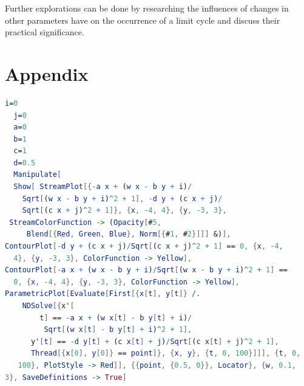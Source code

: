 \documentclass[12pt]{article}
\begin{document}
Further explorations can be done by researching the influences of changes in other parameters have on the occurrence of a limit cycle and discuss their practical significance. 

\section{ Appendix}

\begin{lstlisting}[language=Mathematica, caption=Wilson-Cowan Simulation-Mathematica]
  i=0
  j=0
  a=0
  b=1
  c=1
  d=0.5
  Manipulate[
  Show[ StreamPlot[{-a x + (w x - b y + i)/
    Sqrt[(w x - b y + i)^2 + 1], -d y + (c x + j)/
    Sqrt[(c x + j)^2 + 1]}, {x, -4, 4}, {y, -3, 3}, 
 StreamColorFunction -> (Opacity[#5, 
     Blend[{Red, Green, Blue}, Norm[{#1, #2}]]] &)], 
ContourPlot[-d y + (c x + j)/Sqrt[(c x + j)^2 + 1] == 0, {x, -4, 
  4}, {y, -3, 3}, ColorFunction -> Yellow], 
ContourPlot[-a x + (w x - b y + i)/Sqrt[(w x - b y + i)^2 + 1] == 
  0, {x, -4, 4}, {y, -3, 3}, ColorFunction -> Yellow], 
ParametricPlot[Evaluate[First[{x[t], y[t]} /.
    NDSolve[{x'[
        t] == -a x + (w x[t] - b y[t] + i)/
         Sqrt[(w x[t] - b y[t] + i)^2 + 1], 
      y'[t] == -d y[t] + (c x[t] + j)/Sqrt[(c x[t] + j)^2 + 1], 
      Thread[{x[0], y[0]} == point]}, {x, y}, {t, 0, 100}]]], {t, 0,
   100}, PlotStyle -> Red]], {{point, {0.5, 0}}, Locator}, {w, 0.1, 
3}, SaveDefinitions -> True]
  \end{lstlisting}
\end{document}
